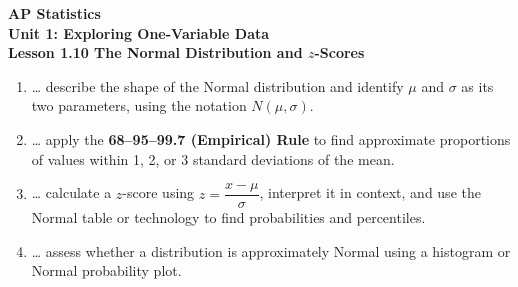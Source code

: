 \documentclass[10pt]{article}
\begin{document}
\vspace{-0.8in}

\begin{center}
  {\color{white}\textbf{\LARGE AP Statistics}}\\[4pt]
  {\color{skymid}\large\textbf{Unit 1: Exploring One-Variable Data}}\\[6pt]
  {\color{white}\textbf{\large Lesson 1.10 \quad The Normal Distribution and $z$-Scores}}
\end{center}

\vspace{0.22in}

\namedateperiod

\vspace{0.18in}

\begin{learningtargetbox}
\small
\begin{enumerate}[leftmargin=1.5em, itemsep=5pt]
  \item \ldots{} describe the shape of the Normal distribution and identify
        $\mu$ and $\sigma$ as its two parameters, using the notation $N(\mu, \sigma)$.
  \item \ldots{} apply the \textbf{68--95--99.7 (Empirical) Rule} to find approximate
        proportions of values within 1, 2, or 3 standard deviations of the mean.
  \item \ldots{} calculate a $z$-score using $z = \dfrac{x - \mu}{\sigma}$, interpret
        it in context, and use the Normal table or technology to find probabilities
        and percentiles.
  \item \ldots{} assess whether a distribution is approximately Normal using a
        histogram or Normal probability plot.
\end{enumerate}
\end{learningtargetbox}

\vspace{0.14in}
\end{document}
